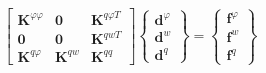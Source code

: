 \begin{equation}
\begin{bmatrix}
\boldsymbol K^{\varphi\varphi} & \boldsymbol 0 & \boldsymbol K^{q\varphi T} \\
\boldsymbol 0 & \boldsymbol 0 & \boldsymbol K^{qwT} \\
\boldsymbol K^{q\varphi} & \boldsymbol K^{qw} & \boldsymbol K^{qq}
\end{bmatrix}
\begin{Bmatrix}
\boldsymbol d^\varphi \\ \boldsymbol d^w \\ \boldsymbol d^q
\end{Bmatrix} =
\begin{Bmatrix}
\boldsymbol f^\varphi \\ \boldsymbol f^w \\ \boldsymbol f^q
\end{Bmatrix}
\end{equation}

